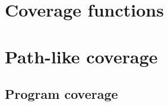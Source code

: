 \section{Coverage functions}
\label{sec:Coverage metrics/Coverage functions}

\section{Path-like coverage}
\label{sec:Coverage metrics/Path-like coverage}

\subsection{Program coverage}
\label{subsec:Coverage metrics/Path-like coverage/Program coverage}

